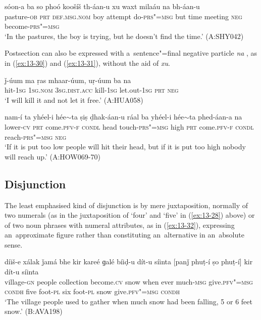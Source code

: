 \begin{exe}
\ex
\label{ex:13-29}
\gll sóon-a ba so phoó koošíš th-áan-u xu waxt milaáu na bh-áan-u \\
pasture-\textsc{ob} \textsc{prt} \textsc{def.msg.nom} boy attempt   do-\textsc{prs"=msg} but time meeting \textsc{neg} become-\textsc{prs"=msg} \\
\glt `In the pastures, the boy is trying, but he doesn't find the time.' (A:SHY042) 
\end{exe}

 Postsection can also be expressed with a~sentence"=final negative particle \textit{na} , as in (\ref{ex:13-30}) and (\ref{ex:13-31}), without the aid of \textit{xu}. 

\begin{exe}
\ex
\label{ex:13-30}
\gll ǰ-úum ma ṛas mhaar-úum, uṛ-úum ba na \\
hit-\textsc{1sg} \textsc{1sg.nom} \textsc{3sg.dist.acc} kill-\textsc{1sg} let.out-\textsc{1sg}
\textsc{prt} \textsc{neg} \\
\glt `I will kill it and not let it free.' (A:HUA058)

\ex
\label{ex:13-31}
\gll nam-í ta yhéel-i hée$\sim$ta ṣiṣ ḍhak-áan-u ráal ba yhéel-i hée$\sim$ta phed-áan-a na \\
lower-\textsc{cv} \textsc{prt} come.\textsc{pfv-f} \textsc{condl} head touch-\textsc{prs"=msg}  high \textsc{prt} come.\textsc{pfv-f} \textsc{condl} reach-\textsc{prs"=msg} \textsc{neg} \\
\glt `If it is put too low people will hit their head, but if it is put too high nobody will reach up.' (A:HOW069-70)
\end{exe}

\subsection{Disjunction}
\label{subsec:13-2-3}

 The least emphasised kind of disjunction is by mere juxtaposition, normally of two numerals (as in the juxtaposition of `four' and `five' in (\ref{ex:13-28}) above) or of two noun phrases with numeral attributes, as in (\ref{ex:13-32}), expressing an~approximate figure rather than constituting an~alternative in an~absolute sense.

\begin{exe}
\ex
\label{ex:13-32}
\gll díiš-e xálak ǰamá bhe kir kareé ɡalé bíiḍ-u dít-u síinta [panǰ phuṭ-í ṣo phuṭ-í] kir dít-u síinta \\
village-\textsc{gn} people collection become.\textsc{cv} snow  when ever much-\textsc{msg} give.\textsc{pfv"=msg} \textsc{condh} five  foot-\textsc{pl} six foot-\textsc{pl} snow give.\textsc{pfv"=msg} \textsc{condh}  \\
\glt `The village people used to gather when much snow had been falling, 5 or 6 feet snow.' (B:AVA198) 
\end{exe}

